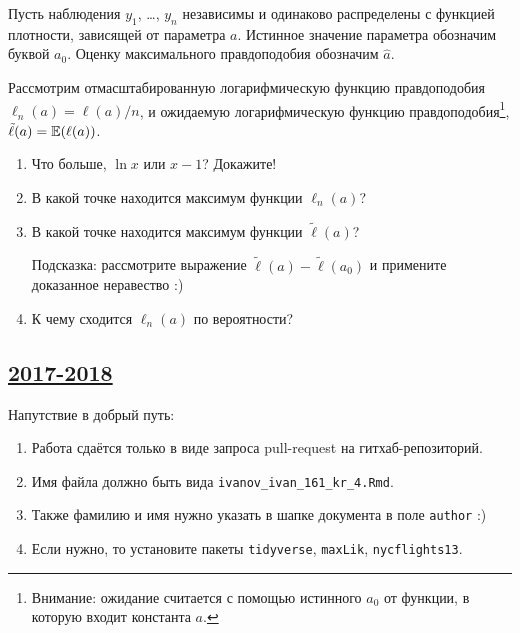 \begin{enumerate}
Пусть наблюдения $y_1$, \ldots, $y_n$ независимы и одинаково распределены с функцией плотности, зависящей от параметра $a$.
Истинное значение параметра обозначим буквой $a_0$. Оценку максимального правдоподобия обозначим $\hat a$.

Рассмотрим отмасштабированную логарифмическую функцию правдоподобия $\ell_n(a)=\ell(a) / n$, и
ожидаемую логарифмическую функцию правдоподобия\footnote{Внимание:
ожидание считается с помощью истинного $a_0$ от функции, в которую входит константа $a$.},
$\tilde \ell(a)=\operatorname{\mathbb{E}}(\ell(a))$.
\begin{enumerate}
\item Что больше, $\ln x$ или $x-1$? Докажите!
\item В какой точке находится максимум функции $\ell_n(a)$?
\item В какой точке находится максимум функции $\tilde \ell(a)$?

Подсказка: рассмотрите выражение $\tilde \ell(a) - \tilde \ell(a_0)$ и примените доказанное неравество :)
\item К чему сходится $\ell_n(a)$ по вероятности?

\end{enumerate}


\end{enumerate}



\subsection[2017-2018]{\hyperref[sec:sol_kr_04_ip_2017_2018]{2017-2018}}
\label{sec:kr_04_ip_2017_2018}


Напутствие в добрый путь:

\begin{enumerate}
\item Работа сдаётся только в виде запроса pull-request на гитхаб-репозиторий.

\item Имя файла должно быть вида \verb|ivanov_ivan_161_kr_4.Rmd|.

\item Также фамилию и имя нужно указать в шапке документа в поле \verb|author| :)

\item Если нужно, то установите пакеты \verb|tidyverse|, \verb|maxLik|, \verb|nycflights13|.
\end{enumerate}


